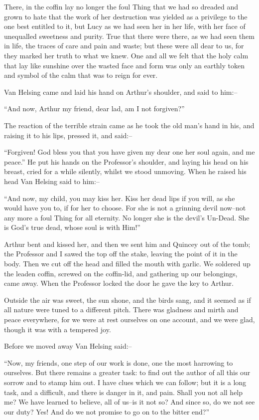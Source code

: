 \documentclass[12pt,openright]{book}
\begin{document}
There, in the coffin lay no longer the foul Thing that we had so dreaded and grown to hate that the work of her destruction was yielded as a privilege to the one best entitled to it, but Lucy as we had seen her in her life, with her face of unequalled sweetness and purity. True that there were there, as we had seen them in life, the traces of care and pain and waste; but these were all dear to us, for they marked her truth to what we knew. One and all we felt that the holy calm that lay like sunshine over the wasted face and form was only an earthly token and symbol of the calm that was to reign for ever.

Van Helsing came and laid his hand on Arthur’s shoulder, and said to him:–

“And now, Arthur my friend, dear lad, am I not forgiven?”

The reaction of the terrible strain came as he took the old man’s hand in his, and raising it to his lips, pressed it, and said:–

“Forgiven! God bless you that you have given my dear one her soul again, and me peace.” He put his hands on the Professor’s shoulder, and laying his head on his breast, cried for a while silently, whilst we stood unmoving. When he raised his head Van Helsing said to him:–

“And now, my child, you may kiss her. Kiss her dead lips if you will, as she would have you to, if for her to choose. For she is not a grinning devil now–not any more a foul Thing for all eternity. No longer she is the devil’s Un-Dead. She is God’s true dead, whose soul is with Him!”

Arthur bent and kissed her, and then we sent him and Quincey out of the tomb; the Professor and I sawed the top off the stake, leaving the point of it in the body. Then we cut off the head and filled the mouth with garlic. We soldered up the leaden coffin, screwed on the coffin-lid, and gathering up our belongings, came away. When the Professor locked the door he gave the key to Arthur.

Outside the air was sweet, the sun shone, and the birds sang, and it seemed as if all nature were tuned to a different pitch. There was gladness and mirth and peace everywhere, for we were at rest ourselves on one account, and we were glad, though it was with a tempered joy.

Before we moved away Van Helsing said:–

“Now, my friends, one step of our work is done, one the most harrowing to ourselves. But there remains a greater task: to find out the author of all this our sorrow and to stamp him out. I have clues which we can follow; but it is a long task, and a difficult, and there is danger in it, and pain. Shall you not all help me? We have learned to believe, all of us–is it not so? And since so, do we not see our duty? Yes! And do we not promise to go on to the bitter end?”
\end{document}
